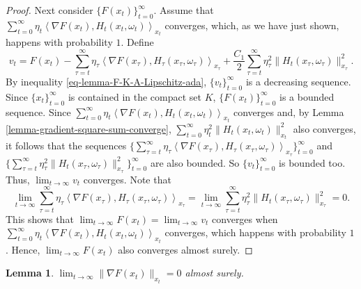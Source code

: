 \documentclass{amsart}
\theoremstyle{plain}
\newtheorem{lemma}[theorem]{Lemma}
\theoremstyle{definition}
\theoremstyle{remark}
\numberwithin{theorem}{section}
\numberwithin{equation}{section}
\begin{document}
\begin{proof}
Next consider $\{F(x_t)\}_{t=0}^\infty$. Assume that $\sum_{t=0}^\infty \eta_t \left\langle \nabla F(x_t), H_t(x_t,\omega_t)\right\rangle_{x_t}$ converges, which, as we have just shown, happens with probability $1$. Define 
\[
v_t = F(x_t) -\sum_{\tau=t}^\infty \eta_\tau \left\langle \nabla F(x_\tau), H_\tau (x_\tau,\omega_\tau)\right\rangle_{x_\tau} + \frac{C_1}{2} \sum_{\tau=t}^\infty \eta_\tau^2\|H_t(x_\tau,\omega_\tau) \|_{x_\tau}^2.
\]
By inequality \eqref{eq-lemma-F-K-A-Lipschitz-ada}, $\{v_t\}_{t=0}^\infty$ is a decreasing sequence. Since $\{x_t\}_{t=0}^\infty$ is contained in the compact set $K$, $\{F(x_t)\}_{t=0}^\infty$ is a bounded sequence.  Since $\sum_{t=0}^\infty \eta_t\left\langle \nabla F(x_t), H_t(x_t,\omega_t)\right\rangle_{x_t}$ converges and, by Lemma \ref{lemma-gradient-square-sum-converge}, $\sum_{t=0}^\infty \eta_t^2\| H_t(x_t, \omega_t)\|_{x_t}^2$ also converges, it follows that the sequences $\{\sum_{\tau=t}^\infty \eta_\tau \left\langle \nabla F(x_\tau), H_\tau (x_\tau,\omega_\tau)\right\rangle_{x_\tau}\}_{t=0}^\infty$ and $\{\sum_{\tau=t}^\infty \eta_\tau^2\|H_t(x_\tau,\omega_\tau) \|_{x_\tau}^2\}_{t=0}^\infty$ are also bounded. So $\{v_t\}_{t=0}^\infty$ is bounded too. Thus, $\lim_{t \rightarrow \infty} v_t$ converges. Note that 
\[
\lim_{t \rightarrow \infty} \sum_{\tau=t}^\infty \eta_\tau \left\langle \nabla F(x_\tau), H_\tau(x_\tau,\omega_\tau)\right\rangle_{x_\tau} = \lim_{t \rightarrow \infty} \sum_{\tau=t}^\infty \eta_\tau^2\|H_t(x_\tau,\omega_\tau) \|_{x_\tau}^2 =0.
\]
This shows that $\lim_{t\rightarrow \infty} F(x_t) = \lim_{t \rightarrow \infty} v_t$ converges when $\sum_{t=0}^\infty \eta_t \left\langle \nabla F(x_t), H_t(x_t,\omega_t)\right\rangle_{x_t}$ converges, which happens with probability $1$. Hence, $\lim_{t\rightarrow \infty} F(x_t)$ also converges almost surely.
\end{proof}


\begin{lemma}\label{lemma-nabla-F-x-t-converge-ada}
$\lim_{t \rightarrow \infty} \|\nabla F(x_t)\|_{x_t} =0$ almost surely.
\end{lemma}
\end{document}
